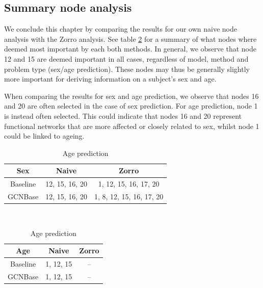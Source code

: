 \subsection{Summary node analysis}

We conclude this chapter by comparing the results for our own naive node analysis with the Zorro analysis. See table \ref{tab:node_analaysis_summary} for a summary of what nodes where deemed most important by each both methods. In general, we observe that node 12 and 15 are deemed important in all cases, regardless of model, method and problem type (sex/age prediction). These nodes may thus be 
generally slightly more important for deriving information on a subject's sex and age. 

When comparing the results for sex and age prediction, we observe that nodes 16 and 20 are often selected in the case of sex prediction. For age prediction, node 1 is instead often selected. This could indicate that nodes 16 and 20 represent functional networks that are more affected or closely related to sex, whilst node 1 could be linked to ageing. 

\begin{table}[H]
    \caption{Summary of selected nodes from naive and zorro methods, for sex and age prediction}
    \begin{subtable}{.5\linewidth}
      \centering
        \caption{Sex prediction}
         \begin{tabular}{||c c c||} 
            \hline
            \textbf{Sex} & Naive & Zorro \\ [0.5ex] 
            \hline\hline
            Baseline & 12, 15, 16, 20 & 1, 12, 15, 16, 17, 20 \\ 
            \hline
            GCNBase & 12, 15, 16, 20 & 1, 8, 12, 15, 16, 17, 20  \\ [1ex] 
            \hline
        \end{tabular}
    \end{subtable}
    \label{tab:node_analaysis_summary} 
    \\
    \begin{subtable}{.5\linewidth}
      \centering
        \caption{Age prediction}
        \begin{tabular}{||c c c||} 
            \hline
            \textbf{Age} & Naive & Zorro \\ [0.5ex] 
            \hline\hline
            Baseline & 1, 12, 15 & -- \\ 
            \hline
            GCNBase & 1, 12, 15 & --  \\ [1ex] 
            \hline
        \end{tabular}
    \end{subtable} 
\end{table}

